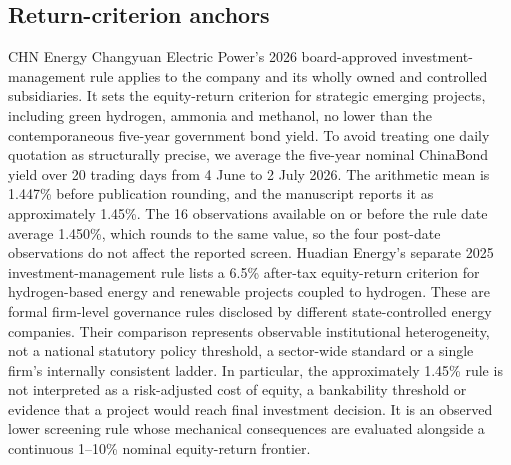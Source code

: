 \documentclass[pdflatex,sn-nature]{sn-jnl}
\begin{document}
\subsection{Return-criterion anchors}

CHN Energy Changyuan Electric Power's 2026 board-approved investment-management rule applies to the company and its wholly owned and controlled subsidiaries. It sets the equity-return criterion for strategic emerging projects, including green hydrogen, ammonia and methanol, no lower than the contemporaneous five-year government bond yield\cite{changyuan2026}. To avoid treating one daily quotation as structurally precise, we average the five-year nominal ChinaBond yield over 20 trading days from 4 June to 2 July 2026. The arithmetic mean is 1.447\% before publication rounding, and the manuscript reports it as approximately 1.45\%\cite{chinabond2026}. The 16 observations available on or before the rule date average 1.450\%, which rounds to the same value, so the four post-date observations do not affect the reported screen. Huadian Energy's separate 2025 investment-management rule lists a 6.5\% after-tax equity-return criterion for hydrogen-based energy and renewable projects coupled to hydrogen\cite{huadian2025}. These are formal firm-level governance rules disclosed by different state-controlled energy companies. Their comparison represents observable institutional heterogeneity, not a national statutory policy threshold, a sector-wide standard or a single firm's internally consistent ladder. In particular, the approximately 1.45\% rule is not interpreted as a risk-adjusted cost of equity, a bankability threshold or evidence that a project would reach final investment decision. It is an observed lower screening rule whose mechanical consequences are evaluated alongside a continuous 1--10\% nominal equity-return frontier.
\end{document}
